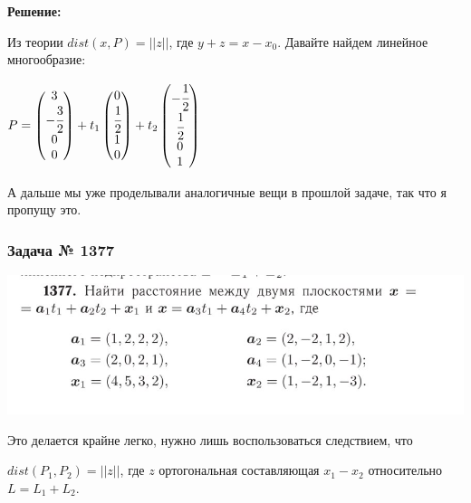 \textbf{Решение:}

Из теории $dist(x,P) = ||z||$, где $y+z =x -x_0$. Давайте найдем линейное многообразие:

$P = \begin{pmatrix}
    3 \\
    -\cfrac{3}{2}\\
    0\\
    0
\end{pmatrix} + t_1 \begin{pmatrix}
    0 \\
    \cfrac{1}{2}\\
    1\\
    0
\end{pmatrix} + t_2 \begin{pmatrix}
    -\cfrac{1}{2}\\
    \cfrac{1}{2}\\
    0\\
    1
\end{pmatrix}$

А дальше мы уже проделывали аналогичные вещи в прошлой задаче, так что я пропущу это.

\subsubsection{Задача № 1377}

\begin{center}
   \includegraphics[width = 16cm]{assets/homework-5-task-1377.jpg}
\end{center}

Это делается крайне легко,  нужно лишь воспользоваться следствием, что 

$dist(P_1, P_2) = ||z||$, где $z$ ортогональная составляющая $x_1-x_2$ относительно $L= L_1 + L_2$.



